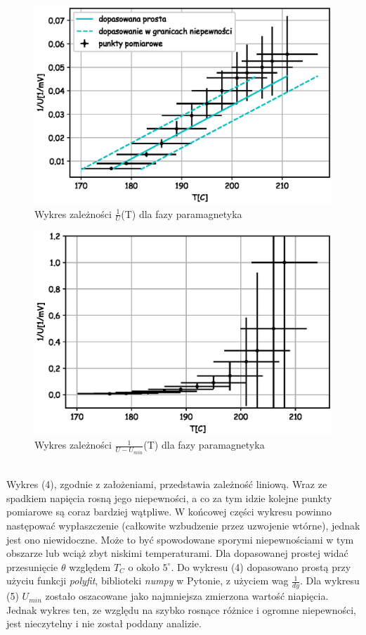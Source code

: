 \documentclass[a4paper,10pt]{article}
\begin{document}
\begin{figure}[H]
  \includegraphics{./Curie_odwrotnosc.eps}
  \caption{Wykres zależności $\frac{1}{U}$(T) dla fazy paramagnetyka}
\end{figure}
\begin{figure}[H]
  \includegraphics{./Curie_odjete.eps}
  \caption{Wykres zależności $\frac{1}{U-U_{min}}$(T) dla fazy paramagnetyka}
\end{figure}
\\Wykres (4), zgodnie z założeniami, przedstawia zależność liniową. Wraz ze spadkiem napięcia rosną jego niepewności, a co za tym idzie kolejne punkty pomiarowe są coraz bardziej wątpliwe. W końcowej części wykresu powinno następować wypłaszczenie (całkowite wzbudzenie przez uzwojenie wtórne), jednak jest ono niewidoczne. Może to być spowodowane sporymi niepewnościami w tym obszarze lub wciąż zbyt niskimi temperaturami. Dla dopasowanej prostej widać przesunięcie $\theta$ względem $T_C$ o około $5^\circ$. Do wykresu (4) dopasowano prostą przy użyciu funkcji \emph{polyfit}, biblioteki \emph{numpy} w Pytonie, z użyciem wag $\frac{1}{dy}$. Dla wykresu (5) $U_{min}$ zostało oszacowane jako najmniejsza zmierzona wartość niapięcia. Jednak wykres ten, ze względu na szybko rosnące różnice i ogromne niepewności, jest nieczytelny i nie został poddany analizie. 
\\
\end{document}
